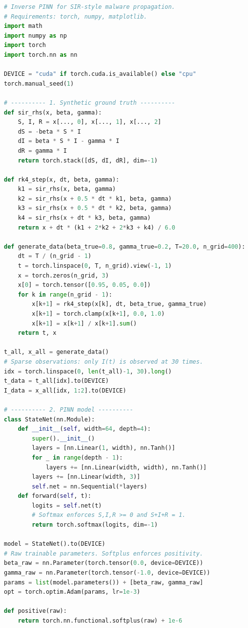 \documentclass[11pt,a4paper]{article}
\begin{document}
\begin{lstlisting}[language=Python]
# Inverse PINN for SIR-style malware propagation.
# Requirements: torch, numpy, matplotlib.
import math
import numpy as np
import torch
import torch.nn as nn

DEVICE = "cuda" if torch.cuda.is_available() else "cpu"
torch.manual_seed(1)

# ---------- 1. Synthetic ground truth ----------
def sir_rhs(x, beta, gamma):
    S, I, R = x[..., 0], x[..., 1], x[..., 2]
    dS = -beta * S * I
    dI = beta * S * I - gamma * I
    dR = gamma * I
    return torch.stack([dS, dI, dR], dim=-1)

def rk4_step(x, dt, beta, gamma):
    k1 = sir_rhs(x, beta, gamma)
    k2 = sir_rhs(x + 0.5 * dt * k1, beta, gamma)
    k3 = sir_rhs(x + 0.5 * dt * k2, beta, gamma)
    k4 = sir_rhs(x + dt * k3, beta, gamma)
    return x + dt * (k1 + 2*k2 + 2*k3 + k4) / 6.0

def generate_data(beta_true=0.8, gamma_true=0.2, T=20.0, n_grid=400):
    dt = T / (n_grid - 1)
    t = torch.linspace(0, T, n_grid).view(-1, 1)
    x = torch.zeros(n_grid, 3)
    x[0] = torch.tensor([0.95, 0.05, 0.0])
    for k in range(n_grid - 1):
        x[k+1] = rk4_step(x[k], dt, beta_true, gamma_true)
        x[k+1] = torch.clamp(x[k+1], 0.0, 1.0)
        x[k+1] = x[k+1] / x[k+1].sum()
    return t, x

t_all, x_all = generate_data()
# Sparse observations: only I(t) is observed at 30 times.
idx = torch.linspace(0, len(t_all)-1, 30).long()
t_data = t_all[idx].to(DEVICE)
I_data = x_all[idx, 1:2].to(DEVICE)

# ---------- 2. PINN model ----------
class StateNet(nn.Module):
    def __init__(self, width=64, depth=4):
        super().__init__()
        layers = [nn.Linear(1, width), nn.Tanh()]
        for _ in range(depth - 1):
            layers += [nn.Linear(width, width), nn.Tanh()]
        layers += [nn.Linear(width, 3)]
        self.net = nn.Sequential(*layers)
    def forward(self, t):
        logits = self.net(t)
        # Softmax enforces S,I,R >= 0 and S+I+R = 1.
        return torch.softmax(logits, dim=-1)

model = StateNet().to(DEVICE)
# Raw trainable parameters. Softplus enforces positivity.
beta_raw = nn.Parameter(torch.tensor(0.0, device=DEVICE))
gamma_raw = nn.Parameter(torch.tensor(-1.0, device=DEVICE))
params = list(model.parameters()) + [beta_raw, gamma_raw]
opt = torch.optim.Adam(params, lr=1e-3)

def positive(raw):
    return torch.nn.functional.softplus(raw) + 1e-6


\end{lstlisting}
\end{document}
